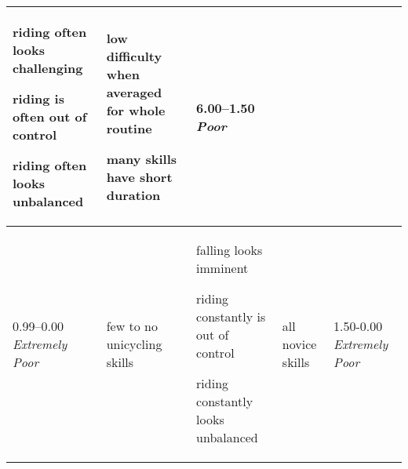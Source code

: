 \begin{minipage}{\textwidth}
\begin{longtable}{|p{1.5cm}|p{5cm}|p{5cm}|p{5cm}|p{1.5cm}|}
\begin{judging_items}%
\item riding often looks challenging
\item riding is often out of control
\item riding often looks unbalanced
\end{judging_items} &

\begin{judging_items}%
\item low difficulty when averaged for whole routine
\item many skills have short duration
\end{judging_items} &

6.00--1.50 \newline
\emph{Poor} \\
\hline

0.99--0.00 \newline
\emph{Extremely Poor} &

\begin{judging_items}%
\item few to no unicycling skills
\end{judging_items} &

\begin{judging_items}%
\item falling looks imminent
\item riding constantly is out of control
\item riding constantly looks unbalanced
\end{judging_items} &

\begin{judging_items}%
\item all novice skills
\end{judging_items} &

1.50-0.00 \newline
\emph{Extremely Poor} \\
\hline

\end{longtable}
\endgroup
\end{minipage}


\newpage
